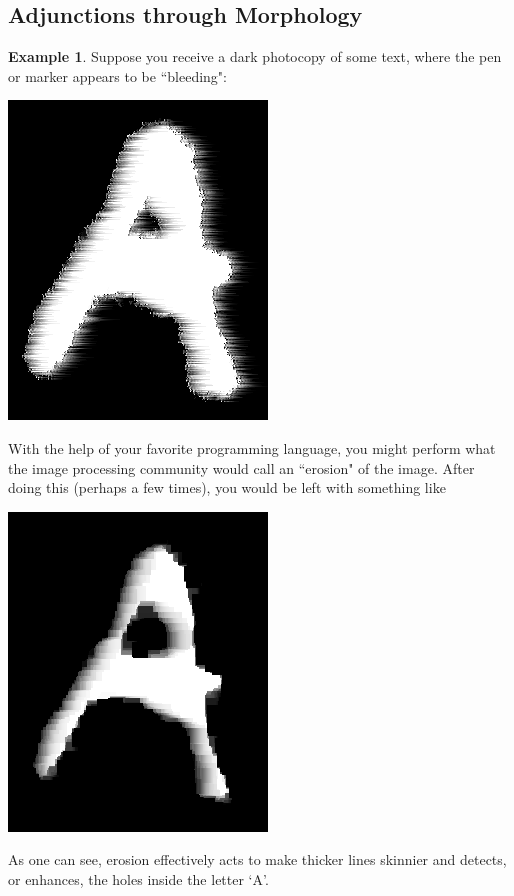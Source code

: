 \documentclass[a4paper]{book}
\theoremstyle{definition}
\newtheorem{example}{Example}[section]
\theoremstyle{definition}
\theoremstyle{definition}
\theoremstyle{theorem}
\theoremstyle{definition}
\begin{document}
\subsection{Adjunctions through Morphology}
\begin{example}
	Suppose you receive a dark photocopy of some text, where the pen or marker appears to be ``bleeding": 
	\begin{center}
		\includegraphics*[scale=0.25]{LetterAOriginal.png}
	\end{center}
	With the help of your favorite programming language, you might perform what the image processing community would call an ``erosion"  of the image. After doing this (perhaps a few times), you would be left with something like
	\begin{center}
		\includegraphics*[scale=0.25]{LetterAAfterErode.png}
	\end{center} 
	As one can see, erosion effectively acts to make thicker lines skinnier and detects, or enhances, the holes inside the letter `A'. \par 

\end{example}
\end{document}
